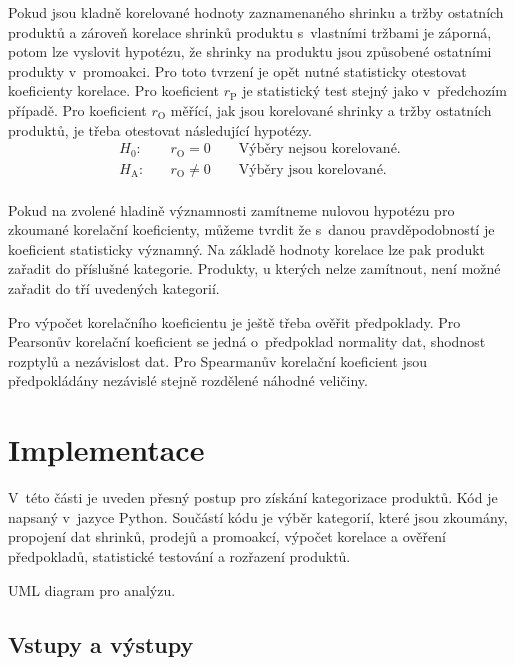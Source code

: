 Pokud jsou kladně korelované hodnoty zaznamenaného shrinku a tržby ostatních produktů a zároveň korelace shrinků produktu s~vlastními tržbami je záporná, potom lze vyslovit hypotézu, že shrinky na produktu jsou způsobené ostatními produkty v~promoakci.
Pro toto tvrzení je opět nutné statisticky otestovat koeficienty korelace. Pro koeficient $r_\mathrm{P}$ je statistický test stejný jako v~předchozím případě. Pro koeficient $r_\mathrm{O}$ měřící, jak jsou korelované shrinky a tržby ostatních produktů, je třeba otestovat následující hypotézy.
\begin{equation*}
    \begin{aligned}
        H_\mathrm{0}: \quad & r_\mathrm{O} = 0 \qquad \mbox{Výběry nejsou korelované.}  \\
        H_\mathrm{A}: \quad & r_\mathrm{O} \neq 0 \qquad\mbox{Výběry jsou korelované.}\\
    \end{aligned}
\end{equation*}

Pokud na zvolené hladině významnosti zamítneme nulovou hypotézu pro zkoumané korelační koeficienty, můžeme tvrdit že s~danou pravděpodobností je koeficient statisticky významný. Na základě hodnoty korelace lze pak produkt zařadit do příslušné kategorie. Produkty, u kterých nelze zamítnout, není možné zařadit do tří uvedených kategorií.

Pro výpočet korelačního koeficientu je ještě třeba ověřit předpoklady. Pro Pearsonův korelační koeficient se jedná o~předpoklad normality dat, shodnost rozptylů a nezávislost dat. Pro Spearmanův korelační koeficient jsou předpokládány nezávislé stejně rozdělené náhodné veličiny.

\section{Implementace}

V~této části je uveden přesný postup pro získání kategorizace produktů. Kód je napsaný v~jazyce Python. Součástí kódu je výběr kategorií, které jsou zkoumány, propojení dat shrinků, prodejů a promoakcí, výpočet korelace a ověření předpokladů, statistické testování a rozřazení produktů.

UML diagram pro analýzu.

\subsection{Vstupy a výstupy}

